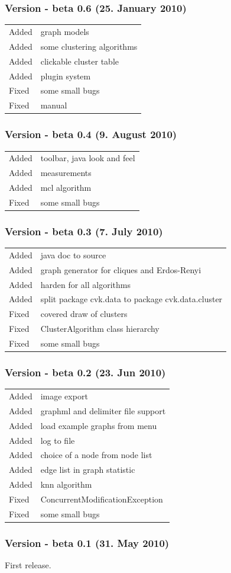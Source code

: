 \documentclass[a4paper, 11pt]{article}
\begin{document}
\subsubsection*{Version - beta 0.6 (25. January 2010)}
\begin{tabular}[ht]{ l  l }
Added & graph models\\
Added & some clustering algorithms\\
Added & clickable cluster table\\
Added & plugin system\\
Fixed & some small bugs\\
Fixed & manual
\end{tabular}
\subsubsection*{Version - beta 0.4 (9. August 2010)}
\begin{tabular}[ht]{ l  l }
Added & toolbar, java look and feel\\
Added & measurements\\
Added & mcl algorithm\\
Fixed & some small bugs
\end{tabular}

\subsubsection*{Version - beta 0.3 (7. July 2010)}
\begin{tabular}[ht]{ l  l }
Added & java doc to source \\
Added & graph generator for cliques and Erdos-Renyi\\
Added & harden for all algorithms\\
Added & split package cvk.data to package cvk.data.cluster\\
Fixed & covered draw of clusters \\
Fixed & ClusterAlgorithm class hierarchy\\
Fixed & some small bugs\\
\end{tabular}

\subsubsection*{Version - beta 0.2 (23. Jun 2010)}
\begin{tabular}[ht]{ l  l }
Added & image export\\
Added & graphml and delimiter file support\\
Added & load example graphs from menu\\
Added & log to file\\
Added & choice of a node from node list\\
Added & edge list in graph statistic\\
Added & knn algorithm \\
Fixed & ConcurrentModificationException\\
Fixed & some small bugs\\
\end{tabular}

\subsubsection*{Version - beta 0.1 (31. May 2010)}
First release.
\newpage


\end{document}
